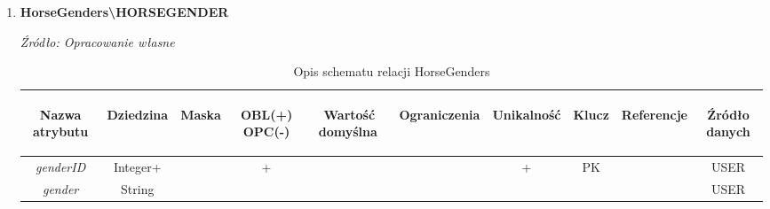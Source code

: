 \documentclass[12pt,twoside]{report}
\begin{document}
\begin{enumerate}[start=10,label={\bfseries REL\textbackslash\arabic*}]
	\item \textbf{HorseGenders\textbackslash HORSEGENDER} 
	\begin{table}[H]
		\caption{Opis schematu relacji HorseGenders}
		\textit{Źródło: Opracowanie własne}
		\label{HorseGendersRelationSchema}
		\centering
		\begin{tabular}{|c|c|c|c|c|c|c|c|c|c|}
			\hline
			\begin{sideways}Nazwa atrybutu\end{sideways}& 
			\begin{sideways}Dziedzina \end{sideways}& 
			\begin{sideways}Maska \end{sideways}& 
			\begin{sideways}OBL(+) OPC(-)\end{sideways} & 
			\begin{sideways}Wartość domyślna$\ $\end{sideways}& 
			\begin{sideways}Ograniczenia\end{sideways} &
			\begin{sideways}Unikalność \end{sideways}& 
			\begin{sideways}Klucz \end{sideways}& 
			\begin{sideways}Referencje \end{sideways}&
			\begin{sideways}Źródło danych\end{sideways}\\
			\hline
			\textit{genderID}&Integer+&&+&&&+&PK&&USER\\	
			\hline
			\textit{gender}&String&&&&&&&&USER\\
			\hline		
		\end{tabular}
	\end{table}
	

\end{enumerate}
\end{document}
